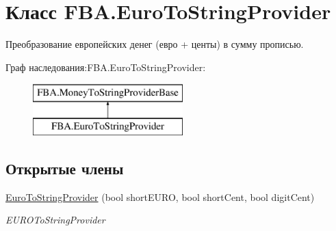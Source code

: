 \hypertarget{class_f_b_a_1_1_euro_to_string_provider}{}\section{Класс F\+B\+A.\+Euro\+To\+String\+Provider}
\label{class_f_b_a_1_1_euro_to_string_provider}


Преобразование европейских денег (евро + центы) в сумму прописью.  


Граф наследования\+:F\+B\+A.\+Euro\+To\+String\+Provider\+:\begin{figure}[H]
\begin{center}
\leavevmode
\includegraphics[height=2.000000cm]{class_f_b_a_1_1_euro_to_string_provider}
\end{center}
\end{figure}
\subsection*{Открытые члены}
\begin{DoxyCompactItemize}
\item 
\mbox{\hyperlink{class_f_b_a_1_1_euro_to_string_provider_a95489fa13c5f7b398c0e7f76c2934133}{Euro\+To\+String\+Provider}} (bool short\+E\+U\+RO, bool short\+Cent, bool digit\+Cent)
\begin{DoxyCompactList}\small\item\em E\+U\+R\+O\+To\+String\+Provider \end{DoxyCompactList}\end{DoxyCompactItemize}
